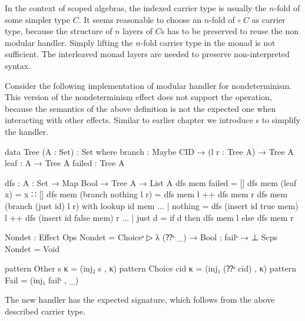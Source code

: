 In the context of scoped algebras, the  indexed carrier type is
usually the $n$-fold of some simpler type $C$.
It seems reasonable to choose an $n$-fold of
\AgdaSpace{}\AgdaSpace{}$\circ\; C$ as
carrier type, because the structure of $n$ layers of $C$s has to be preserved to
reuse the non modular handler.
Simply lifting the $n$-fold carrier type in the monad is not sufficient.
The interleaved monad layers are needed to preserve non-interpreted syntax.

Consider the following implementation of modular handler for nondeterminism.
This version of the nondeterminism effect does not support the
 operation, because the semantics of the above definition is
not the expected one when interacting with other effects.
Similar to earlier chapter we introduce s to simplify
the handler.

\begin{code}[hide]
data Tree (A : Set) : Set where
  branch : Maybe CID → (l r : Tree A) → Tree A
  leaf   : A → Tree A
  failed : Tree A

dfs : {A : Set} → Map Bool → Tree A → List A
dfs mem failed                   = []
dfs mem (leaf x)                 = x ∷ []
dfs mem (branch nothing    l r)  = dfs mem l ++ dfs mem r
dfs mem (branch (just id)  l r) with lookup id mem
... | nothing  = dfs (insert id true mem) l ++ dfs (insert id false mem) r
... | just d   = if d then dfs mem l else dfs mem r
\end{code}
\begin{code}
Nondet : Effect
Ops   Nondet = Choiceˢ ▷ λ{ (⁇ˢ _) → Bool ; failˢ → ⊥ }
Scps  Nondet = Void

pattern Other s κ     = (inj₂ s , κ)
pattern Choice cid κ  = (inj₁ (⁇ˢ cid) , κ)
pattern Fail          = (inj₁ failˢ , _)
\end{code}
The new handler has the expected signature, which follows from the above
described carrier type.

